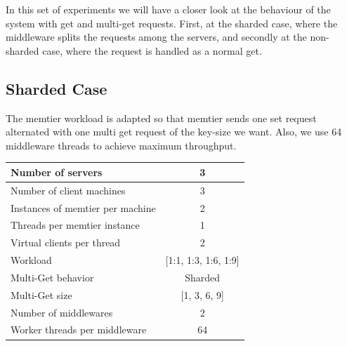 \documentclass[11pt,a4paper]{article}
\begin{document}
In this set of experiments we will have a closer look at the behaviour of the system with get and multi-get requests. First, at the sharded case, where the middleware splits the requests among the servers, and secondly at the non-sharded case, where the request is handled as a normal get. 

\subsection{Sharded Case}
The memtier workload is adapted so that memtier sends one set request alternated with one multi get request of the key-size we want. Also, we use 64 middleware threads to achieve maximum throughput. 

\begin{center}
	\scriptsize{
		\begin{tabular}{|l|c|}
			\hline Number of servers                & 3                       \\ 
			\hline Number of client machines        & 3                       \\ 
			\hline Instances of memtier per machine & 2                       \\ 
			\hline Threads per memtier instance     & 1                       \\
			\hline Virtual clients per thread       & 2     		            \\ 
			\hline Workload                         & [1:1, 1:3, 1:6, 1:9]           \\
			\hline Multi-Get behavior               & Sharded                \\
			\hline Multi-Get size                   & [1, 3, 6, 9]                  \\
			\hline Number of middlewares            & 2                       \\
			\hline Worker threads per middleware    & 64 \\
			\hline 
		\end{tabular}
	} 
\end{center}
\end{document}
